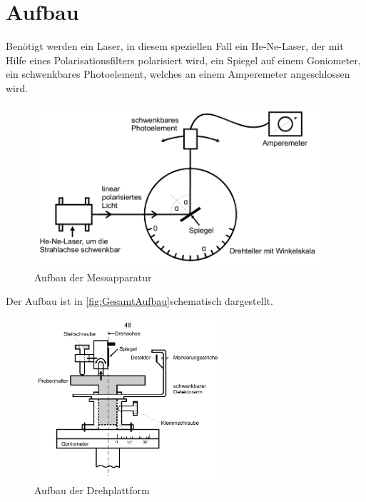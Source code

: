 \section{Aufbau}
\label{sec:Aufbau}
Benötigt werden ein Laser, in diesem speziellen Fall ein He-Ne-Laser, der mit Hilfe eines Polarisationsfilters polarisiert wird, ein Spiegel auf einem Goniometer, ein schwenkbares Photoelement, welches an einem Amperemeter angeschlossen wird. 
\begin{figure}
    \centering
    \includegraphics[height = 6cm]{GesamtAufbau.pdf}
    \caption{Aufbau der Messapparatur}
\end{figure}
Der Aufbau ist in \autoref{fig:GesamtAufbau}schematisch dargestellt.




\begin{figure}
    \centering
    \includegraphics[height = 6cm]{AufbauKlein.pdf}
    \caption{Aufbau der Drehplattform}
\end{figure}
